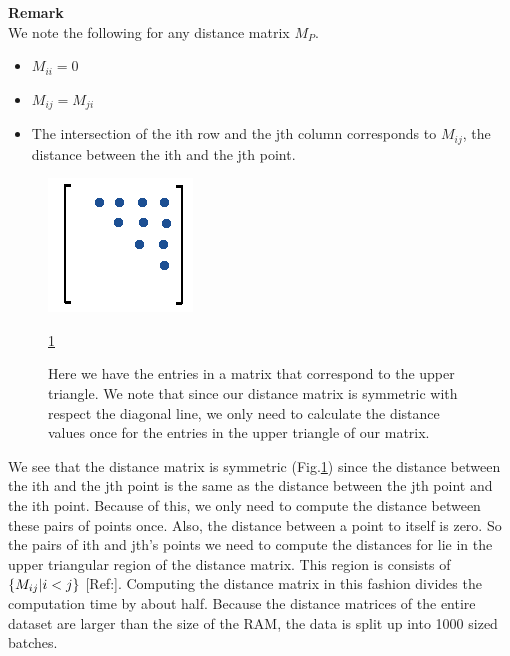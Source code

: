 \documentclass[12pt, a4paper, twocolumn, fullpage]{article}
\theoremstyle{plain}
\theoremstyle{definition}
\theoremstyle{remark}
\begin{document}
\noindent
\textbf{Remark}
\\
    We note the following for any distance matrix $M_{P}$.
    \begin{itemize}
        \item $M_{ii} = 0$
        \item $M_{ij} = M_{ji}$
        \item The intersection of the ith row and the jth column corresponds to $M_{ij}$, the distance between the ith and the jth point.
    \end{itemize}
    
\begin{figure}[h]
	\centering
    \includegraphics[width=.7\linewidth]{uptry.png}
    \caption{Here we have the entries in a matrix that correspond to the upper triangle. We note that since our distance matrix is symmetric with respect the diagonal line, we only need to calculate the distance values once for the entries in the upper triangle of our matrix.}
     \ref{uptry}
    \label{uptry}
\end{figure}
    

We see that the distance matrix is symmetric (Fig.\ref{uptry}) since the distance between the ith and the jth point is the same as the distance between the jth point and the ith point. Because of this, we only need to compute the distance between these pairs of points once. Also, the distance between a point to itself is zero. So the pairs of ith and jth's points we need to compute the distances for lie in the upper triangular region of the distance matrix. This region is consists of $\{ M_{ij} \space | \space i<j \}$ [Ref:]. Computing the distance matrix in this fashion divides the computation time by about half. Because the distance matrices of the entire dataset are larger than the size of the RAM, the data is split up into 1000 sized batches. 
\end{document}
